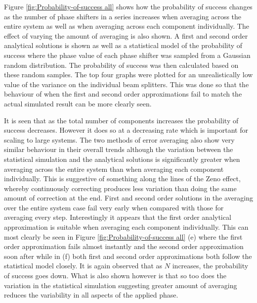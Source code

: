 \documentclass[aps,pra,twocolumn,superscriptaddress,numerical]{revtex4-1}
\begin{document}
			
			Figure \ref{fig:Probability-of-success all} shows how the probability of success changes as the number of phase shifters in a series increases when averaging across the entire system as well as when averaging across each component individually. The effect of varying the amount of averaging is also shown. A first and second order analytical solutions	is  shown as well as a statistical model of the probability of success where the phase value of each phase shifter was sampled from a Gaussian random distribution. The probability of success was then calculated based on these random samples. The top four graphs were plotted for an unrealistically low value of the variance on the individual beam splitters. This was done so that the behaviour of when the first and second order approximations fail to match the actual simulated result can be more clearly seen. 
			
			It is seen that as the total number of components increases the probability of success decreases. However it does so at a decreasing rate which is important for scaling to large systems. The two methods of error averaging also show very similar behaviour in their overall trends although the variation between the statistical simulation and the analytical solutions is significantly greater when averaging across the entire system than when averaging each component individually. This is suggestive of something along the lines of the Zeno effect, whereby continuously correcting produces less variation than doing the same amount of correction at the end. First and second order solutions in the averaging over the entire system case fail very early when compared with those for averaging every step. Interestingly it appears that the first order analytical approximation is suitable when averaging each component individually. This can most clearly be seen in Figure \ref{fig:Probability-of-success all} (e) where the first order approximation fails almost instantly and the second order approximation soon after while in (f) both first and second order approximations both follow the statistical model closely. It is again observed that as $N$ increases, the probability of success goes down. What is also shown however is that so too does the variation in the statistical simulation suggesting greater amount of averaging reduces the variability in all aspects of the applied phase.
			
\end{document}
